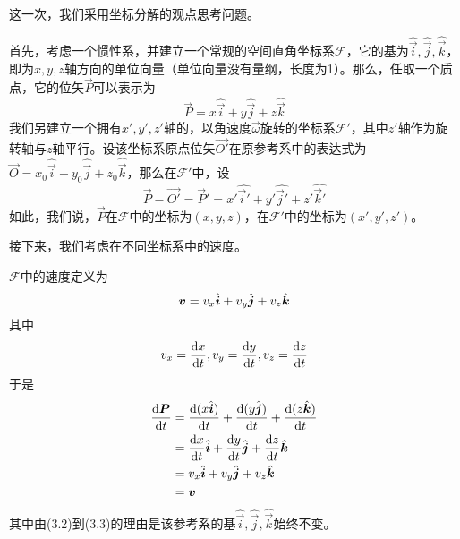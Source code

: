 \begin{prove}
    这一次，我们采用坐标分解的观点思考问题。

    首先，考虑一个惯性系，并建立一个常规的空间直角坐标系$\mathcal{F}$，它的基为$\hat{\vec{i}},\hat{\vec{j}},\hat{\vec{k}}$，即为$x,y,z$轴方向的单位向量（单位向量没有量纲，长度为1）。那么，任取一个质点，它的位矢$\vec{P}$可以表示为\[
        \vec{P}=x\hat{\vec{i}}+y\hat{\vec{j}}+z\hat{\vec{k}}
    \]
    我们另建立一个拥有$x',y',z'$轴的，以角速度$\vec{\omega}$旋转的坐标系$\mathcal{F}'$，其中$z'$轴作为旋转轴与$z$轴平行。设该坐标系原点位矢$\vec{O'}$在原参考系中的表达式为$\vec{O}=x_0\hat{\vec{i}}+y_0\hat{\vec{j}}+z_0\hat{\vec{k}}$，那么在$\mathcal{F}'$中，设
    \[\vec{P}-\vec{O'}=\vec{P}'=x'\hat{\vec{i}'}+y'\hat{\vec{j}'}+z'\hat{\vec{k}'}\]
    如此，我们说，$\vec{P}$在$\mathcal{F}$中的坐标为$(x,y,z)$，在$\mathcal{F}'$中的坐标为$(x',y',z')$。

    接下来，我们考虑在不同坐标系中的速度。

    $\mathcal{F}$中的速度定义为\[\boldsymbol{v}=v_x\hat{\boldsymbol{i}}+v_y\hat{\boldsymbol{j}}+v_z\hat{\boldsymbol{k}}\]其中
    \[v_x=\dfrac{\dif x}{\dif t},v_y=\dfrac{\dif y}{\dif t},v_z=\dfrac{\dif z}{\dif t}\]
    于是
    \begin{align}
        \dfrac{\dif\vec{P}}{\dif t} & =\dfrac{\dif(x\hat{\vec{i}})}{\dif t}+\dfrac{\dif(y\hat{\vec{j}})}{\dif t}+\dfrac{\dif(z\hat{\vec{k}})}{\dif t} \\
                                    & =\dfrac{\dif x}{\dif t}\hat{\vec{i}}+\dfrac{\dif y}{\dif t}\hat{\vec{j}}+\dfrac{\dif z}{\dif t}\hat{\vec{k}}    \\
                                    & =v_x\hat{\vec{i}}+v_y\hat{\vec{j}}+v_z\hat{\vec{k}}                                                             \\
                                    & =\vec{v}
    \end{align}
    其中由(3.2)到(3.3)的理由是该参考系的基$\hat{\vec{i}},\hat{\vec{j}},\hat{\vec{k}}$始终不变。


\end{prove}
